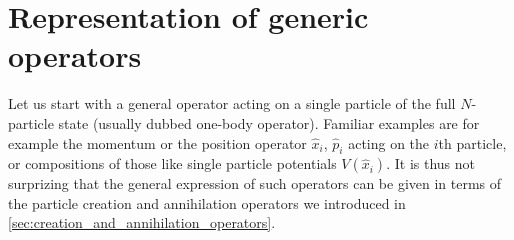 \section{Representation of generic operators}
\label{sec:representation_of_generic_operators}
Let us start with a general operator acting on a single particle of the full $N$-particle state (usually dubbed one-body operator).
Familiar examples are for example the momentum or the position operator $\hat x_i$, $\hat p_i$ acting on the $i$th particle, or compositions of those like single particle potentials $V(\hat x_i)$.
It is thus not surprizing that the general expression of such operators can be given in terms of the particle creation and annihilation operators we introduced in \cref{sec:creation_and_annihilation_operators}.


